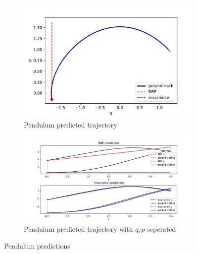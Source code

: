 \documentclass{statsmsc}
\begin{document}
\begin{figure}[H]
     \centering
     \begin{subfigure}[b]{0.6\linewidth}
        \centering
        \includegraphics[width=\linewidth]{../codes/figures/pendulum_predicted_trajectory.pdf}
        \caption{Pendulum predicted trajectory}
        \label{fig:pendulum_prediction_combined}
     \end{subfigure}
     \hfill
     \begin{subfigure}[b]{0.6\linewidth}
         \centering
         \includegraphics[width=\linewidth]{../codes/figures/pendulum_predicted_trajectory_seperate.pdf}
         \caption{Pendulum predicted trajectory with $q, p$ seperated}
         \label{fig:pendulum_prediction_seperate}
     \end{subfigure}
        \caption{Pendulum predictions}
        \label{fig:pendulum_prediction}
\end{figure}
\end{document}
